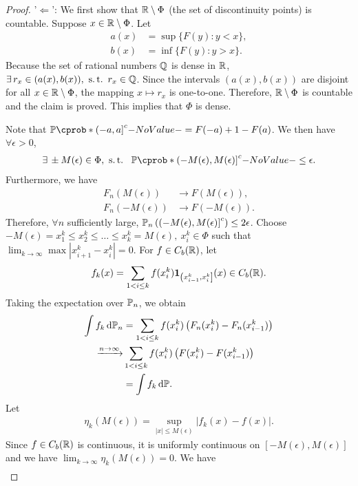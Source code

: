 \documentclass[12pt]{article}
\begin{document}
\begin{proof}
'$\Leftarrow$': We first show that $\mathbb{R} \setminus \Phi$ (the set of discontinuity points) is countable. Suppose $x \in \mathbb{R} \setminus \Phi$. Let 
\begin{align*}
a(x) &= \sup \{F(y) : y < x \}, \\
b(x) &= \inf \{F(y) : y > x \}.
\end{align*}
Because the set of rational numbers $\mathbb{Q}$ is dense in $\mathbb{R}$, $\exists r_x \in (a(x), b(x)), \ \st r_x \in \bbQ$. Since the intervals $(a(x),b(x))$ are disjoint for all $x\in\mathbb{R}\setminus\Phi$, the mapping $x \mapsto r_x$ is one-to-one. Therefore, $\mathbb{R}\setminus\Phi$ is countable and the claim is proved. This implies that $\Phi$ is dense.

Note that $\P({\left(-a, a\right]^c}) = F(-a) + 1 - F(a)$. We then have $\forall \epsilon > 0$,
\begin{align*}
\exists \pm M(\epsilon)\in \Phi, \ \st\ \P({\left(-M(\epsilon), M(\epsilon)\right]^c}) \leq \epsilon.
\end{align*}
Furthermore, we have
\begin{align*}
F_n(M(\epsilon)) &\to F(M(\epsilon)), \\
F_n(-M(\epsilon)) &\to F(-M(\epsilon)).
\end{align*}
Therefore, $\forall n$ sufficiently large, $\P_n \left({\left(-M(\epsilon), M(\epsilon)\right]^c}\right) \leq 2 \epsilon$. Choose $-M(\epsilon) = x_1^k \leq x_2^k \leq \ldots \leq x_k^k = M(\epsilon), \ x_i^k \in \Phi$ such that $\lim_{k \to \infty} \max|x_{i+1}^k - x_i^k| = 0$. For $f\in C_b(\mathbb{R})$, let
\begin{align*}
f_k(x) 
= \sum_{1 < i \leq k} f(x_i^k) {\bf 1}_{\left( x_{i-1}^k, x_i^k\right]}(x) \in C_b(\mathbb{R}).
\end{align*}
Taking the expectation over $\P_n$, we obtain
\begin{align}
\int f_k \ud\P_n 
&= \sum_{1 < i \leq k} f(x_i^k) \left(F_n(x_i^k) - F_n(x_{i-1}^k)\right) \nn
\xrightarrow{n\to\infty}& \sum_{1 < i \leq k} f(x_i^k) \left(F(x_i^k) - F(x_{i-1}^k)\right) \nn
&= \int f_k \ud\P. \label{wk9:convd_if_conv_in_cdf_1}
\end{align}
Let
\begin{align*}
\eta_k(M(\epsilon)) = \sup_{|x| \leq M(\epsilon)} \left| f_k(x) - f(x) \right|.
\end{align*}
Since $f \in C_b(\mathbb{R})$ is continuous, it is uniformly continuous on $[-M(\epsilon),M(\epsilon)]$ and we have $\lim_{k \to \infty} \eta_k(M(\epsilon)) = 0$. We have
\begin{align}

\end{align}
\end{proof}
\end{document}
